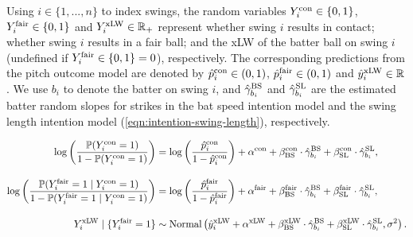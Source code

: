 \documentclass{article}
\begin{document}
      Using $i \in \{1, ..., n\}$ to index swings, the random variables $Y_i^{\mbox{\scriptsize con}} \in \{0, 1\}$, $Y_i^{\mbox{\scriptsize fair}} \in \{0, 1\}$ and $Y_i^{\mbox{\scriptsize xLW}} \in \mathbb{R}_+$ represent whether swing $i$ results in contact; whether swing $i$ results in a fair ball; and the xLW of the batter ball on swing $i$ (undefined if $Y_i^{\mbox{\scriptsize fair}} \in \{0, 1\} = 0$), respectively. The corresponding predictions from the pitch outcome model are denoted by $\hat p_i^{\mbox{\scriptsize con}} \in (0, 1)$,  $\hat p_i^{\mbox{\scriptsize fair}} \in (0, 1)$ and $\hat y_i^{\mbox{\scriptsize xLW}} \in \mathbb{R}$. We use $b_i$ to denote the batter on swing $i$, and $\hat\gamma_{b_i}^{\mbox{\scriptsize BS}}$ and $\hat\gamma_{b_i}^{\mbox{\scriptsize SL}}$ are the estimated batter random slopes for strikes in the bat speed intention model and the swing length intention model (\ref{eqn:intention-swing-length}), respectively.

      \begin{align}
        \label{eqn:causal-contact}
        \log \left(
          \frac{\mathbb{P}(Y_i^{\mbox{\scriptsize con}} = 1)}{1 - \mathbb{P}(Y_i^{\mbox{\scriptsize con}} = 1)}
        \right) &= \log \left(
          \frac{\hat p_i^{\mbox{\scriptsize con}}}{1 - \hat p_i^{\mbox{\scriptsize con}}}
        \right) +
          \alpha^{\mbox{\scriptsize con}} +
          \beta_{\mbox{\scriptsize BS}}^{\mbox{\scriptsize con}} \cdot
            \hat\gamma_{b_i}^{\mbox{\scriptsize BS}} +
          \beta_{\mbox{\scriptsize SL}}^{\mbox{\scriptsize con}} \cdot
            \hat\gamma_{b_i}^{\mbox{\scriptsize SL}},\\[10pt]
        \label{eqn:causal-fair}
        \log \left(
          \frac{
            \mathbb{P}(Y_i^{\mbox{\scriptsize fair}} = 1 \mid Y_i^{\mbox{\scriptsize con}} = 1)
          }{
            1 - \mathbb{P}(Y_i^{\mbox{\scriptsize fair}} = 1 \mid Y_i^{\mbox{\scriptsize con}} = 1)
          }
        \right) &= \log \left(
          \frac{\hat p_i^{\mbox{\scriptsize fair}}}{1 - \hat p_i^{\mbox{\scriptsize fair}}}
        \right) +
          \alpha^{\mbox{\scriptsize fair}} +
          \beta_{\mbox{\scriptsize BS}}^{\mbox{\scriptsize fair}} \cdot
            \hat\gamma_{b_i}^{\mbox{\scriptsize BS}} +
          \beta_{\mbox{\scriptsize SL}}^{\mbox{\scriptsize fair}} \cdot
            \hat\gamma_{b_i}^{\mbox{\scriptsize SL}},\\[10pt]
        \label{eqn:causal-hit}
        Y_i^{\mbox{\scriptsize xLW}} \mid \{Y_i^{\mbox{\scriptsize fair}} = 1\} &\sim
          \mbox{Normal}\left(
            \hat y_i^{\mbox{\scriptsize xLW}} +
              \alpha^{\mbox{\scriptsize xLW}} +
              \beta_{\mbox{\scriptsize BS}}^{\mbox{\scriptsize xLW}} \cdot
                \hat\gamma_{b_i}^{\mbox{\scriptsize BS}} +
              \beta_{\mbox{\scriptsize SL}}^{\mbox{\scriptsize xLW}} \cdot
                \hat\gamma_{b_i}^{\mbox{\scriptsize SL}},
            \sigma^2
          \right).
      \end{align}
\end{document}

